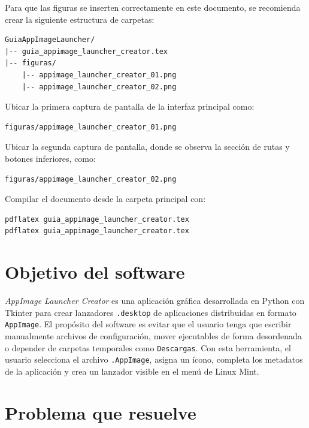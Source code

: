 \documentclass[11pt,a4paper]{article}
\begin{document}
Para que las figuras se inserten correctamente en este documento, se recomienda crear la siguiente estructura de carpetas:

\begin{lstlisting}[style=textstyle]
GuiaAppImageLauncher/
|-- guia_appimage_launcher_creator.tex
|-- figuras/
    |-- appimage_launcher_creator_01.png
    |-- appimage_launcher_creator_02.png
\end{lstlisting}

Ubicar la primera captura de pantalla de la interfaz principal como:

\begin{lstlisting}[style=textstyle]
figuras/appimage_launcher_creator_01.png
\end{lstlisting}

Ubicar la segunda captura de pantalla, donde se observa la sección de rutas y botones inferiores, como:

\begin{lstlisting}[style=textstyle]
figuras/appimage_launcher_creator_02.png
\end{lstlisting}

Compilar el documento desde la carpeta principal con:

\begin{lstlisting}[style=bashstyle]
pdflatex guia_appimage_launcher_creator.tex
pdflatex guia_appimage_launcher_creator.tex
\end{lstlisting}

\section{Objetivo del software}

\textit{AppImage Launcher Creator} es una aplicación gráfica desarrollada en Python con Tkinter para crear lanzadores \texttt{.desktop} de aplicaciones distribuidas en formato \texttt{AppImage}. El propósito del software es evitar que el usuario tenga que escribir manualmente archivos de configuración, mover ejecutables de forma desordenada o depender de carpetas temporales como \texttt{Descargas}. Con esta herramienta, el usuario selecciona el archivo \texttt{.AppImage}, asigna un ícono, completa los metadatos de la aplicación y crea un lanzador visible en el menú de Linux Mint.

\section{Problema que resuelve}
\end{document}
